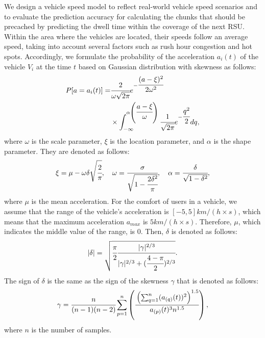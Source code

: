 \documentclass[journal]{IEEEtran}
\begin{document}
We design a vehicle speed model to reflect real-world vehicle speed scenarios and to evaluate the prediction accuracy for calculating the chunks that should be precached by predicting the dwell time within the coverage of the next RSU.
Within the area where the vehicles are located, their speeds follow an average speed, taking into account several factors such as rush hour congestion and hot spots.
Accordingly, we formulate the probability of the acceleration $a_{i}(t)$ of the vehicle $V_{i}$ at the time $t$ based on Gaussian distribution with skewness \cite{Azzalini} as follows:
\begin{equation}
    \begin{split}
        P[a=a_{i}(t)]=&\cfrac{2}{\omega\sqrt{2\pi}} e^{-\cfrac{(a-\xi)^{2}}{2\omega^{2}}} \\
                & \times\int_{-\infty}^{\alpha\left(\cfrac{a-\xi}{\omega}\right)} \cfrac{1}{\sqrt{2\pi}} e^{-\cfrac{q^2}{2}} dq,
    \end{split}
\end{equation}
where $\omega$ is the scale parameter, $\xi$ is the location parameter, and $\alpha$ is the shape parameter.
They are denoted as follows:
\begin{equation} 
    \xi = \mu-\omega\delta\sqrt{\cfrac{2}{\pi}}, \quad
    \omega = \cfrac{\sigma}{\sqrt{1-\cfrac{2\delta^{2}}{\pi}}}, \quad
    \alpha = \cfrac{\delta}{\sqrt{1-\delta^{2}}}, \end{equation}
where $\mu$ is the mean acceleration.
For the comfort of users in a vehicle, we assume that the range of the vehicle's acceleration is $[-5, 5] km/(h\times s)$, which means that the maximum acceleration $a_{max}$ is $5 km/(h\times s)$.
Therefore, $\mu$, which indicates the middle value of the range, is 0.
Then, $\delta$ is denoted as follows:
\begin{equation}
        |\delta| = \sqrt{\cfrac{\pi}{2} \cfrac{|\gamma|^{2/3}}{|\gamma|^{2/3}+(\cfrac{4-\pi}{2})^{2/3}}}.
\end{equation}
The sign of $\delta$ is the same as the sign of the skewness $\gamma$ that is denoted as follows:
\begin{equation}
        \gamma = \cfrac{n}{(n-1)(n-2)} \sum^{n}_{p=1}\left( \cfrac{\left(\sum^{n}_{q=1}(a_{(q)}(t))^{2} \right)^{1.5}}{a_{(p)}(t)^{3}n^{1.5}} \right),
\end{equation}
where $n$ is the number of samples.
\end{document}

